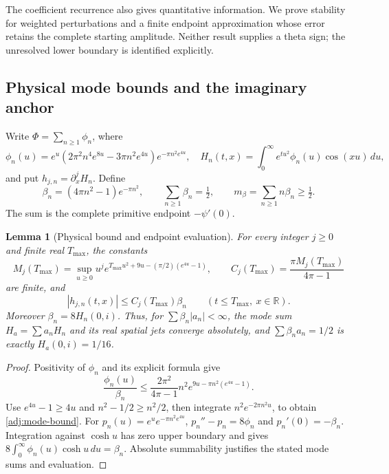 \documentclass[11pt]{article}
\numberwithin{equation}{section}
\newtheorem{lemma}[theorem]{Lemma}
\theoremstyle{definition}
\theoremstyle{remark}
\newcommand{\R}{\mathbb R}
\begin{document}
The coefficient recurrence also gives quantitative information.
We prove stability for weighted perturbations and a finite endpoint
approximation whose error retains the complete starting amplitude.
Neither result supplies a theta sign; the unresolved lower boundary
is identified explicitly.

\subsection{Physical mode bounds and the imaginary anchor}

Write $\Phi=\sum_{n\ge1}\phi_n$, where
\[
 \phi_n(u)=e^u(2\pi^2n^4e^{8u}-3\pi n^2e^{4u})
                  e^{-\pi n^2e^{4u}},
 \quad
 H_n(t,x)=\int_0^\infty e^{tu^2}\phi_n(u)\cos(xu)\,du,
\]
and put $h_{j,n}=\partial_x^jH_n$.  Define
\begin{equation}
 \beta_n=(4\pi n^2-1)e^{-\pi n^2},\qquad
 \sum_{n\ge1}\beta_n=\tfrac12,\qquad
 m_\beta=\sum_{n\ge1}n\beta_n\ge\tfrac12.
 \label{adj:beta}
\end{equation}
The sum is the complete primitive endpoint $-\psi'(0)$.

\begin{lemma}[Physical bound and endpoint evaluation]
\label{adj:physical-bound}
For every integer $j\ge0$ and finite real $T_{\max}$, the constants
\[
 M_j(T_{\max})=\sup_{u\ge0}u^j
 e^{T_{\max}u^2+9u-(\pi/2)(e^{4u}-1)},\qquad
 C_j(T_{\max})=\frac{\pi M_j(T_{\max})}{4\pi-1}
\]
are finite, and
\begin{equation}
 |h_{j,n}(t,x)|\le C_j(T_{\max})\beta_n
 \qquad(t\le T_{\max},\ x\in\R).
 \label{adj:mode-bound}
\end{equation}
Moreover $\beta_n=8H_n(0,i)$.  Thus, for
$\sum\beta_n|a_n|<\infty$, the mode sum $H_a=\sum a_nH_n$
and its real spatial jets converge absolutely, and
$\sum\beta_na_n=1/2$ is exactly $H_a(0,i)=1/16$.
\end{lemma}
\begin{proof}
Positivity of $\phi_n$ and its explicit formula give
\[
 \frac{\phi_n(u)}{\beta_n}\le
 \frac{2\pi^2}{4\pi-1}n^2
 e^{9u-\pi n^2(e^{4u}-1)}.
\]
Use $e^{4u}-1\ge4u$ and $n^2-1/2\ge n^2/2$,
then integrate $n^2e^{-2\pi n^2u}$, to obtain
\eqref{adj:mode-bound}.  For
$p_n(u)=e^ue^{-\pi n^2e^{4u}}$,
$p_n''-p_n=8\phi_n$ and $p_n'(0)=-\beta_n$.
Integration against $\cosh u$ has zero upper boundary and gives
$8\int_0^\infty\phi_n(u)\cosh u\,du=\beta_n$.
Absolute summability justifies the stated mode sums and evaluation.
\end{proof}
\end{document}
